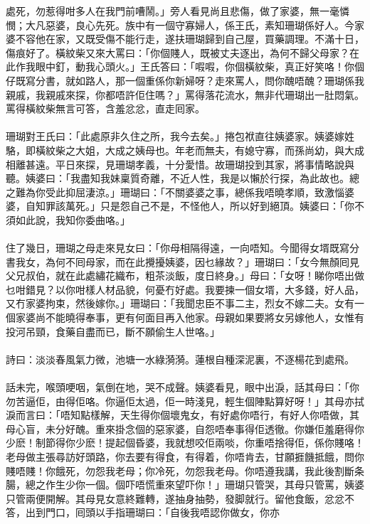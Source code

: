 \documentclass[a5paper, 10pt, openany]{book} %
\begin{document}
處死，勿惹得咁多人在我門前嘈鬧。」旁人看見尚且悲傷，做了家婆，無一毫憐憫；大凡惡婆，良心先死。族中有一個守寡婦人，係王氏，素知珊瑚係好人。今家婆不容他在家，又既受傷不能行走，遂扶珊瑚歸到自己屋，買藥調理。不滿十日，傷痕好了。橫紋柴又來大罵曰：「你個賤人，既被丈夫逐出，為何不歸父母家？在此作我眼中釘，動我心頭火。」王氏答曰：「㗇㗇，你個橫紋柴，真正好笑咯！你個仔既寫分書，就如路人，那一個重係你新婦呀？走來罵人，問你醜唔醜？珊瑚係我親戚，我親戚來探，你都唔許佢住嗎？」罵得落花流水，無非代珊瑚出一肚悶氣。罵得橫紋柴無言可答，含羞忿忿，直走囘家。\\\\	珊瑚對王氏曰：「此處原非久住之所，我今去矣。」捲包袱直往姨婆家。姨婆嫁姓駱，即橫紋柴之大姐，大成之姨母也。年老而無夫，有媳守寡，而孫尚幼，與大成相離甚遠。平日來探，見珊瑚孝義，十分愛惜。故珊瑚投到其家，將事情略說與聽。姨婆曰：「我盡知我妹稟質奇離，不近人性，我是以懶於行探，為此故也。總之難為你受此抑屈淒涼。」珊瑚曰：「不關婆婆之事，總係我唔曉孝順，致激惱婆婆，自知罪該萬死。」只是怨自己不是，不怪他人，所以好到絕頂。姨婆曰：「你不須如此說，我知你委曲咯。」\\\\	住了幾日，珊瑚之母走來見女曰：「你母相隔得遠，一向唔知。今聞得女壻既寫分書我女，為何不囘母家，而在此攪擾姨婆，因乜緣故？」珊瑚曰：「女今無顏囘見父兄叔伯，就在此處繡花織布，粗茶淡飯，度日終身。」母曰：「女呀！睇你唔出做乜咁錯見？以你咁樣人材品貌，何憂冇好處。我要揀一個女壻，大多錢，好人品，又冇家婆拘束，然後嫁你。」珊瑚曰：「我聞忠臣不事二主，烈女不嫁二夫。女有一個家婆尚不能曉得奉事，更有何面目再入他家。母親如果要將女另嫁他人，女惟有投河吊頸，食藥自盡而已，斷不願偷生人世咯。」\\\\	詩曰：淡淡春風氣力微，池塘一水綠漪漪。蓮根自種深泥裏，不逐楊花到處飛。\\\\	話未完，喉頭哽咽，氣倒在地，哭不成聲。姨婆看見，眼中出淚，話其母曰：「你勿苦逼佢，由得佢咯。你逼佢太過，佢一時淺見，輕生個陣點算好呀！」其母亦拭淚而言曰：「唔知點樣解，天生得你個壞鬼女，有好處你唔行，有好人你唔做，其母心盲，未分好醜。重來掛念個的惡家婆，自怨唔奉事得佢透徹。你嫌佢羞磨得你少麽！制節得你少麽！提起個昏婆，我就想咬佢兩啖，你重唔捨得佢，係你賤咯！老母做主張尋訪好頭路，你去要有得食，有得着，你唔肯去，甘願捱饑抵餓，問你賤唔賤！你餓死，勿怨我老母；你冷死，勿怨我老母。你唔遵我講，我此後割斷条腸，總之作生少你一個。個吓唔慌重來望吓你！」珊瑚只管哭，其母只管罵，姨婆只管兩便開解。其母見女意終難轉，遂抽身抽勢，發脚就行。留他食飯，忿忿不答，出到門口，囘頭以手指珊瑚曰：「自後我唔認你做女，你亦
\end{document}
